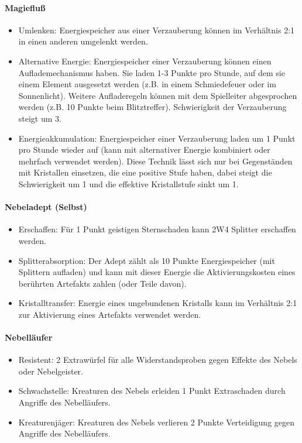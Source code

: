 \documentclass{article}
\begin{document}
\paragraph{Magiefluß}

\begin{itemize}
\item Umlenken: Energiespeicher aus einer Verzauberung können im Verhältnis 2:1 in einen anderen umgelenkt werden.
\item Alternative Energie: Energiespeicher einer Verzauberung können einen Auflademechanismus haben. Sie laden 1-3 Punkte pro Stunde, auf dem sie einem Element ausgesetzt werden (z.B. in einem Schmiedefeuer oder im Sonnenlicht). Weitere Aufladeregeln können mit dem Spielleiter abgesprochen werden (z.B. 10 Punkte beim Blitztreffer). Schwierigkeit der Verzauberung steigt um 3.
\item Energieakkumulation: Energiespeicher einer Verzauberung laden um 1 Punkt pro Stunde wieder auf (kann mit alternativer Energie kombiniert oder mehrfach verwendet werden). Diese Technik lässt sich nur bei Gegenständen mit Kristallen einsetzen, die eine positive Stufe haben, dabei steigt die Schwierigkeit um 1 und die effektive Kristallstufe sinkt um 1.
\end{itemize}

\paragraph{Nebeladept (Selbst)}

\begin{itemize}
\item Erschaffen: Für 1 Punkt geistigen Sternschaden kann 2W4 Splitter erschaffen werden.
\item Splitterabsorption: Der Adept zählt als 10 Punkte Energiespeicher (mit Splittern aufladen) und kann mit dieser Energie die Aktivierungskosten eines berührten Artefakts zahlen (oder Teile davon).
\item Kristalltransfer: Energie eines ungebundenen Kristalls kann im Verhältnis 2:1 zur Aktivierung eines Artefakts verwendet werden.
\end{itemize}

\paragraph{Nebelläufer}

\begin{itemize}
\item Resistent: 2 Extrawürfel für alle Widerstandsproben gegen Effekte des Nebels oder Nebelgeister.
\item Schwachstelle: Kreaturen des Nebels erleiden 1 Punkt Extraschaden durch Angriffe des Nebelläufers.
\item Kreaturenjäger: Kreaturen des Nebels verlieren 2 Punkte Verteidigung gegen Angriffe des Nebelläufers.
\end{itemize}
\end{document}

